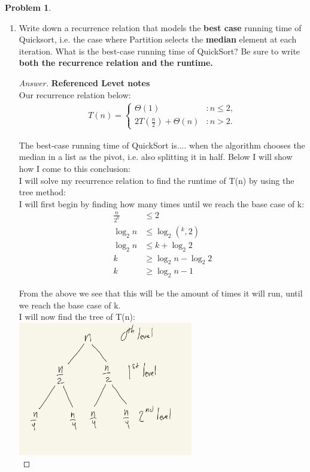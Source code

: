 \documentclass[11pt]{article}
\theoremstyle{definition}
\theoremstyle{definition}
\newtheorem{required}{Problem}
\theoremstyle{definition}
\begin{document}
\begin{required} \label{unrolling}
\begin{enumerate}[label=(\alph*)]
\subsection{Part \ref{S20a}}

\item \label{S20a} Write down a recurrence relation that models the {\bf best case} running time of Quicksort, i.e. the case where {\sc Partition} selects the {\bf median} element at each iteration. What is the best-case running time of QuickSort? Be sure to write \textbf{both the recurrence relation and the runtime.}

\begin{proof}[Answer] \textbf{Referenced Levet notes} \\
Our recurrence relation below: \\
\begin{align*}
T(n) = \begin{cases}
\Theta(1) & : n \leq 2, \\
2T(\frac{n}{2}) + \Theta(n) & : n > 2.
\end{cases}
\end{align*}

The best-case running time of QuickSort is.... when the algorithm chooses the median in a list as the pivot, i.e. also splitting it in half. Below I will show how I come to this conclusion: \\

I will solve my recurrence relation to find the runtime of T(n) by using the tree method: \\
I will first begin by finding how many times until we reach the base case of k: \\
\begin{align*}
\frac{n}{2^k} &\leq 2 \\
\log_2 n &\leq \log_2 (^k, 2) \\
\log_2 n &\leq k + \log_2 2 \\
k &\geq \log_2 n - \log_2 2 \\
k &\geq \log_2 n - 1
\end{align*}

From the above we see that this will be the amount of times it will run, until we reach the base case of k. \\
I will now find the tree of T(n): \\
\includegraphics[width=0.6\textwidth]{IMG_D7646ABE293A-1.jpeg}\\


\end{proof}
\end{enumerate}
\end{required}
\end{document}
